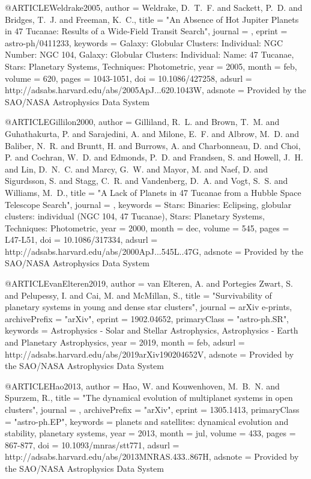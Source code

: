 \documentclass[twocolumn,tighten]{aastex63}
\begin{document}
{@ARTICLE{Weldrake2005,
   author = {{Weldrake}, D.~T.~F. and {Sackett}, P.~D. and {Bridges}, T.~J. and 
	{Freeman}, K.~C.},
    title = "{An Absence of Hot Jupiter Planets in 47 Tucanae: Results of a Wide-Field Transit Search}",
  journal = {\apj},
   eprint = {astro-ph/0411233},
 keywords = {Galaxy: Globular Clusters: Individual: NGC Number: NGC 104, Galaxy: Globular Clusters: Individual: Name: 47 Tucanae, Stars: Planetary Systems, Techniques: Photometric},
     year = 2005,
    month = feb,
   volume = 620,
    pages = {1043-1051},
      doi = {10.1086/427258},
   adsurl = {http://adsabs.harvard.edu/abs/2005ApJ...620.1043W},
  adsnote = {Provided by the SAO/NASA Astrophysics Data System}
}

@ARTICLE{Gillilon2000,
   author = {{Gilliland}, R.~L. and {Brown}, T.~M. and {Guhathakurta}, P. and 
	{Sarajedini}, A. and {Milone}, E.~F. and {Albrow}, M.~D. and 
	{Baliber}, N.~R. and {Bruntt}, H. and {Burrows}, A. and {Charbonneau}, D. and 
	{Choi}, P. and {Cochran}, W.~D. and {Edmonds}, P.~D. and {Frandsen}, S. and 
	{Howell}, J.~H. and {Lin}, D.~N.~C. and {Marcy}, G.~W. and {Mayor}, M. and 
	{Naef}, D. and {Sigurdsson}, S. and {Stagg}, C.~R. and {Vandenberg}, D.~A. and 
	{Vogt}, S.~S. and {Williams}, M.~D.},
    title = "{A Lack of Planets in 47 Tucanae from a Hubble Space Telescope Search}",
  journal = {\apjl},
 keywords = {Stars: Binaries: Eclipsing, globular clusters: individual (NGC 104, 47 Tucanae), Stars: Planetary Systems, Techniques: Photometric},
     year = 2000,
    month = dec,
   volume = 545,
    pages = {L47-L51},
      doi = {10.1086/317334},
   adsurl = {http://adsabs.harvard.edu/abs/2000ApJ...545L..47G},
  adsnote = {Provided by the SAO/NASA Astrophysics Data System}
}

@ARTICLE{vanElteren2019,
   author = {{van Elteren}, A. and {Portegies Zwart}, S. and {Pelupessy}, I. and 
	{Cai}, M. and {McMillan}, S.},
    title = "{Survivability of planetary systems in young and dense star clusters}",
  journal = {arXiv e-prints},
archivePrefix = "arXiv",
   eprint = {1902.04652},
 primaryClass = "astro-ph.SR",
 keywords = {Astrophysics - Solar and Stellar Astrophysics, Astrophysics - Earth and Planetary Astrophysics},
     year = 2019,
    month = feb,
   adsurl = {http://adsabs.harvard.edu/abs/2019arXiv190204652V},
  adsnote = {Provided by the SAO/NASA Astrophysics Data System}
}

@ARTICLE{Hao2013,
   author = {{Hao}, W. and {Kouwenhoven}, M.~B.~N. and {Spurzem}, R.},
    title = "{The dynamical evolution of multiplanet systems in open clusters}",
  journal = {\mnras},
archivePrefix = "arXiv",
   eprint = {1305.1413},
 primaryClass = "astro-ph.EP",
 keywords = {planets and satellites: dynamical evolution and stability, planetary systems},
     year = 2013,
    month = jul,
   volume = 433,
    pages = {867-877},
      doi = {10.1093/mnras/stt771},
   adsurl = {http://adsabs.harvard.edu/abs/2013MNRAS.433..867H},
  adsnote = {Provided by the SAO/NASA Astrophysics Data System}
}

}
\end{document}
